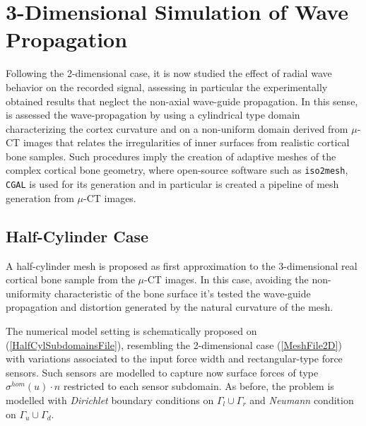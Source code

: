 \section{3-Dimensional Simulation of Wave Propagation}
Following the 2-dimensional case, it is now studied the effect of radial wave behavior on the recorded signal, assessing in particular the experimentally obtained results that neglect the non-axial wave-guide propagation. In this sense, is assessed the wave-propagation by using a cylindrical type domain characterizing the cortex curvature and on a non-uniform domain derived from $\mu$-CT images that relates the irregularities of inner surfaces from realistic cortical bone samples.
Such procedures imply the creation of adaptive meshes of the complex cortical bone geometry, where open-source software such as \texttt{iso2mesh}, \texttt{CGAL} is used for its generation and in particular is created a pipeline of mesh generation from $\mu$-CT images.

\subsection{Half-Cylinder Case}
A half-cylinder mesh is proposed as first approximation to the 3-dimensional real cortical bone sample from the $\mu$-CT images. In this case, avoiding the non-uniformity characteristic of the bone surface it's tested the wave-guide propagation and distortion generated by the natural curvature of the mesh.

The numerical model setting is schematically proposed on (\ref{HalfCylSubdomainsFile}), resembling the 2-dimensional case (\ref{MeshFile2D}) with variations associated to the input force width and rectangular-type force sensors. Such sensors are modelled to capture now surface forces of type $\sigma^{hom}(u)\cdot n$ restricted to each sensor subdomain. As before, the problem is modelled with \textit{Dirichlet} boundary conditions on $\Gamma_l \cup \Gamma_r$ and \textit{Neumann} condition on $\Gamma_u \cup \Gamma_d$.

